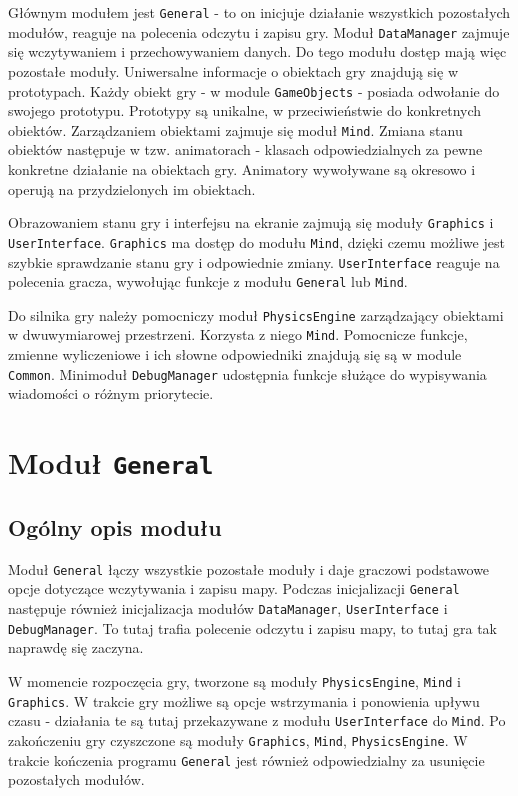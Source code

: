 \documentclass[licencjacka]{pracamgr}
\begin{document}
    Głównym modułem jest \texttt{General} - to on inicjuje działanie wszystkich pozostałych modułów, reaguje na
    polecenia odczytu i zapisu gry. Moduł \texttt{DataManager} zajmuje się wczytywaniem i przechowywaniem danych.
    Do tego modułu dostęp mają więc pozostałe moduły. Uniwersalne informacje o obiektach gry znajdują się w prototypach.
    Każdy obiekt gry - w module \texttt{GameObjects} - posiada odwołanie do swojego prototypu. Prototypy są unikalne,
    w przeciwieństwie do konkretnych obiektów. Zarządzaniem obiektami zajmuje się moduł \texttt{Mind}. Zmiana stanu
    obiektów następuje w tzw. animatorach - klasach odpowiedzialnych za pewne konkretne działanie na obiektach gry.
    Animatory wywoływane są okresowo i operują na przydzielonych im obiektach.

    Obrazowaniem stanu gry i interfejsu na ekranie zajmują się moduły \texttt{Graphics} i \texttt{UserInterface}.
    \texttt{Graphics} ma dostęp do modułu \texttt{Mind}, dzięki czemu możliwe jest szybkie sprawdzanie stanu
    gry i odpowiednie zmiany. \texttt{UserInterface} reaguje na polecenia gracza, wywołując funkcje z modułu
    \texttt{General} lub \texttt{Mind}.

    Do silnika gry należy pomocniczy moduł \texttt{PhysicsEngine} zarządzający obiektami w dwuwymiarowej przestrzeni.
    Korzysta z niego \texttt{Mind}. Pomocnicze funkcje, zmienne wyliczeniowe i ich słowne odpowiedniki znajdują się
    są w module \texttt{Common}. Minimoduł \texttt{DebugManager} udostępnia funkcje służące do wypisywania wiadomości
    o różnym priorytecie.

  \section{Moduł \texttt{General}}
    \subsection{Ogólny opis modułu}
      Moduł \texttt{General} łączy wszystkie pozostałe moduły i daje graczowi podstawowe opcje dotyczące wczytywania i zapisu
      mapy. Podczas inicjalizacji \texttt{General} następuje również inicjalizacja modułów \texttt{DataManager}, \texttt{UserInterface} i
      \texttt{DebugManager}. To tutaj trafia polecenie odczytu i zapisu mapy, to tutaj gra tak naprawdę się zaczyna.

      W momencie rozpoczęcia gry, tworzone są moduły \texttt{PhysicsEngine}, \texttt{Mind} i \texttt{Graphics}. W trakcie gry możliwe są
      opcje wstrzymania i ponowienia upływu czasu - działania te są tutaj przekazywane z modułu \texttt{UserInterface} do
      \texttt{Mind}. Po zakończeniu gry czyszczone są moduły \texttt{Graphics}, \texttt{Mind}, \texttt{PhysicsEngine}. W trakcie kończenia programu
      \texttt{General} jest również odpowiedzialny za usunięcie pozostałych modułów.
\end{document}
